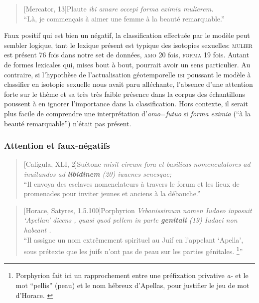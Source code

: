 \begin{quote}[Mercator, 13]{Plaute}
    \textit{ibi amare occepi forma eximia mulierem.} \\
    \enquote{Là, je commençais à aimer une femme à la beauté remarquable.}
\end{quote}

Faux positif qui est bien un négatif, la classification effectuée par le modèle peut sembler logique, tant le lexique présent est typique des isotopies sexuelles: \textsc{mulier} est présent 76 fois dans notre set de données, \textsc{amo} 20 fois, \textsc{forma} 19 fois. Autant de formes lexicales qui, mises bout à bout, pourrait avoir un sens particulier. Au contraire, si l'hypothèse de l'actualisation géotemporelle \textsc{ibi} poussant le modèle à classifier en isotopie sexuelle nous avait paru alléchante, l'absence d'une attention forte sur le thème et sa très très faible présence dans la corpus des échantillons poussent à en ignorer l'importance dans la classification. Hors contexte, il serait plus facile de comprendre une interprétation d'\textit{amo}=\textit{futuo} si \textit{forma eximia} (\enquote{à la beauté remarquable}) n'était pas présent.

\subsubsection{Attention et faux-négatifs}

\begin{quote}[Caligula, XLI, 2]{Suétone}
    \textit{misit circum fora et basilicas nomenculatores ad inuitandos ad \textbf{libidinem} (20) iuuenes senesque;} \\
    \enquote{Il envoya des esclaves nomenclateurs à travers le forum et les lieux de promenades pour inviter jeunes et anciens à la débauche.}
\end{quote}

\begin{quote}[Horace, Satyres, 1.5.100]{Porphyrion}
    \textit{Vrbanissimum nomen Iudaeo inposuit ‘Apellan’ dicens , quasi quod pellem in parte \textbf{genitali} (19) Iudaei non habeant .} \\
    \enquote{Il assigne un nom extrêmement spirituel au Juif en l'appelant ‘Apella’, sous prétexte que les juifs n'ont pas de peau sur les parties génitales. \footnote{Porphyrion fait ici un rapprochement entre une préfixation privative \textit{a-} et le mot ``pellis'' (peau) et le nom hébreux d'Apellas, pour justifier le jeu de mot d'Horace. \cite{cordier2001romains}}}
\end{quote}


